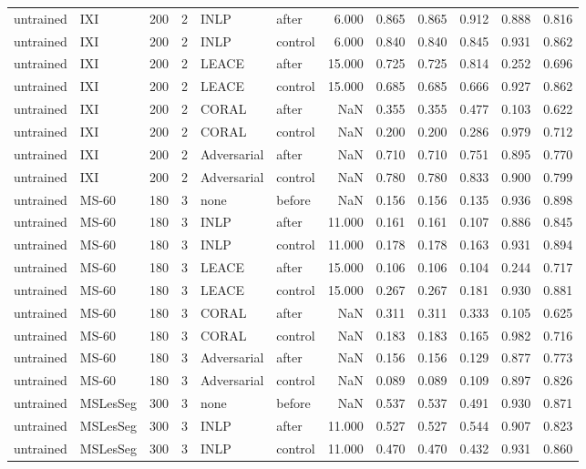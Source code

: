 \begin{tabular}{llrrllrrrrrr}
untrained & IXI & 200 & 2 & INLP & after & 6.000 & 0.865 & 0.865 & 0.912 & 0.888 & 0.816 \\
untrained & IXI & 200 & 2 & INLP & control & 6.000 & 0.840 & 0.840 & 0.845 & 0.931 & 0.862 \\
untrained & IXI & 200 & 2 & LEACE & after & 15.000 & 0.725 & 0.725 & 0.814 & 0.252 & 0.696 \\
untrained & IXI & 200 & 2 & LEACE & control & 15.000 & 0.685 & 0.685 & 0.666 & 0.927 & 0.862 \\
untrained & IXI & 200 & 2 & CORAL & after & NaN & 0.355 & 0.355 & 0.477 & 0.103 & 0.622 \\
untrained & IXI & 200 & 2 & CORAL & control & NaN & 0.200 & 0.200 & 0.286 & 0.979 & 0.712 \\
untrained & IXI & 200 & 2 & Adversarial & after & NaN & 0.710 & 0.710 & 0.751 & 0.895 & 0.770 \\
untrained & IXI & 200 & 2 & Adversarial & control & NaN & 0.780 & 0.780 & 0.833 & 0.900 & 0.799 \\
untrained & MS-60 & 180 & 3 & none & before & NaN & 0.156 & 0.156 & 0.135 & 0.936 & 0.898 \\
untrained & MS-60 & 180 & 3 & INLP & after & 11.000 & 0.161 & 0.161 & 0.107 & 0.886 & 0.845 \\
untrained & MS-60 & 180 & 3 & INLP & control & 11.000 & 0.178 & 0.178 & 0.163 & 0.931 & 0.894 \\
untrained & MS-60 & 180 & 3 & LEACE & after & 15.000 & 0.106 & 0.106 & 0.104 & 0.244 & 0.717 \\
untrained & MS-60 & 180 & 3 & LEACE & control & 15.000 & 0.267 & 0.267 & 0.181 & 0.930 & 0.881 \\
untrained & MS-60 & 180 & 3 & CORAL & after & NaN & 0.311 & 0.311 & 0.333 & 0.105 & 0.625 \\
untrained & MS-60 & 180 & 3 & CORAL & control & NaN & 0.183 & 0.183 & 0.165 & 0.982 & 0.716 \\
untrained & MS-60 & 180 & 3 & Adversarial & after & NaN & 0.156 & 0.156 & 0.129 & 0.877 & 0.773 \\
untrained & MS-60 & 180 & 3 & Adversarial & control & NaN & 0.089 & 0.089 & 0.109 & 0.897 & 0.826 \\
untrained & MSLesSeg & 300 & 3 & none & before & NaN & 0.537 & 0.537 & 0.491 & 0.930 & 0.871 \\
untrained & MSLesSeg & 300 & 3 & INLP & after & 11.000 & 0.527 & 0.527 & 0.544 & 0.907 & 0.823 \\
untrained & MSLesSeg & 300 & 3 & INLP & control & 11.000 & 0.470 & 0.470 & 0.432 & 0.931 & 0.860 \\

\end{tabular}
